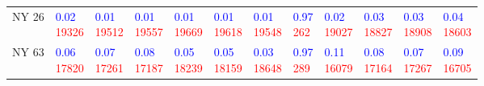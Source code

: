 \begin{tabular}{llllllllllll}
NY 26  &  \makecell{\textcolor{blue}{0.02} \\ \textcolor{red}{19326}} &  \makecell{\textcolor{blue}{0.01} \\ \textcolor{red}{19512}} &  \makecell{\textcolor{blue}{0.01} \\ \textcolor{red}{19557}} &  \makecell{\textcolor{blue}{0.01} \\ \textcolor{red}{19669}} &  \makecell{\textcolor{blue}{0.01} \\ \textcolor{red}{19618}} &  \makecell{\textcolor{blue}{0.01} \\ \textcolor{red}{19548}} &   \makecell{\textcolor{blue}{0.97} \\ \textcolor{red}{262}} &  \makecell{\textcolor{blue}{0.02} \\ \textcolor{red}{19027}} &  \makecell{\textcolor{blue}{0.03} \\ \textcolor{red}{18827}} &  \makecell{\textcolor{blue}{0.03} \\ \textcolor{red}{18908}} &  \makecell{\textcolor{blue}{0.04} \\ \textcolor{red}{18603}} \\
NY 63  &  \makecell{\textcolor{blue}{0.06} \\ \textcolor{red}{17820}} &  \makecell{\textcolor{blue}{0.07} \\ \textcolor{red}{17261}} &  \makecell{\textcolor{blue}{0.08} \\ \textcolor{red}{17187}} &  \makecell{\textcolor{blue}{0.05} \\ \textcolor{red}{18239}} &  \makecell{\textcolor{blue}{0.05} \\ \textcolor{red}{18159}} &  \makecell{\textcolor{blue}{0.03} \\ \textcolor{red}{18648}} &   \makecell{\textcolor{blue}{0.97} \\ \textcolor{red}{289}} &  \makecell{\textcolor{blue}{0.11} \\ \textcolor{red}{16079}} &  \makecell{\textcolor{blue}{0.08} \\ \textcolor{red}{17164}} &  \makecell{\textcolor{blue}{0.07} \\ \textcolor{red}{17267}} &  \makecell{\textcolor{blue}{0.09} \\ \textcolor{red}{16705}} \\

\end{tabular}
